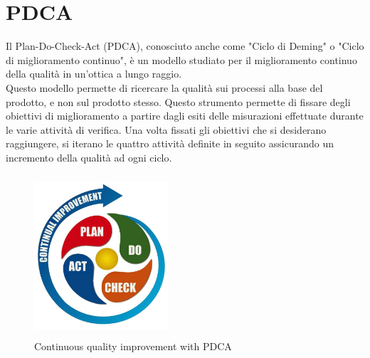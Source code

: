 \documentclass[PianoDiQualifica.tex]{subfiles}
\begin{document}
\section{PDCA}

Il Plan-Do-Check-Act (PDCA), conosciuto anche come "Ciclo di Deming" o "Ciclo di miglioramento continuo", è un modello studiato per il miglioramento continuo della qualità in un’ottica a lungo raggio.\\ 
Questo modello permette di ricercare la qualità sui processi alla base del prodotto, e non sul prodotto stesso.
Questo strumento permette di fissare degli obiettivi di miglioramento a partire dagli esiti delle misurazioni effettuate durante le varie attività di verifica.
Una volta fissati gli obiettivi che si desiderano raggiungere, si iterano le quattro attività definite in seguito assicurando un incremento della qualità ad ogni ciclo.
\begin{figure}[htbp]
	\centering
	\includegraphics[height=6cm, width=5cm]{pdca.jpg}
	\caption{Continuous quality improvement with PDCA}\label{fig:pdca}
\end{figure}
\end{document}
